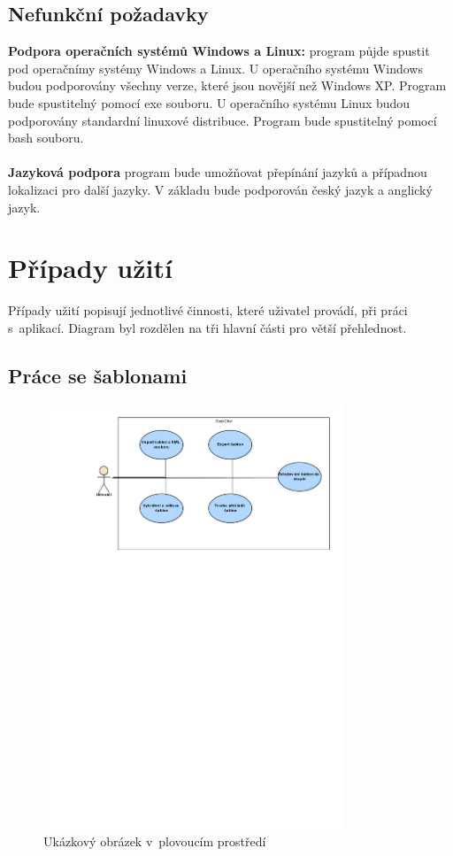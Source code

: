 \documentclass[thesis=B,czech]{resources/FITthesis}[2012/06/26]
\begin{document}
\subsection{Nefunkční požadavky}

\textbf{Podpora operačních systémů Windows a Linux:} program půjde spustit pod operačnímy systémy Windows a Linux. U operačního systému Windows budou podporovány všechny verze, které jsou novější než Windows XP. Program bude spustitelný pomocí exe souboru. U operačního systému Linux budou podporovány standardní linuxové distribuce. Program bude spustitelný pomocí bash souboru.\\
\\
\textbf{Jazyková podpora} program bude umožňovat přepínání jazyků a případnou lokalizaci pro další jazyky. V základu bude podporován český jazyk a anglický jazyk.



\section{Případy užití}
Případy užití popisují jednotlivé činnosti, které uživatel provádí, při práci s~aplikací. Diagram byl rozdělen na tři hlavní části pro větší přehlednost.
\subsection{Práce se šablonami}
\begin{figure}\centering
	\includegraphics[width=0.8\textwidth]{images/usecase_sablony}
	\caption[Usecase šablony]{Ukázkový obrázek v~plovoucím prostředí}\label{fig:uc_sablony}
\end{figure}
\end{document}
